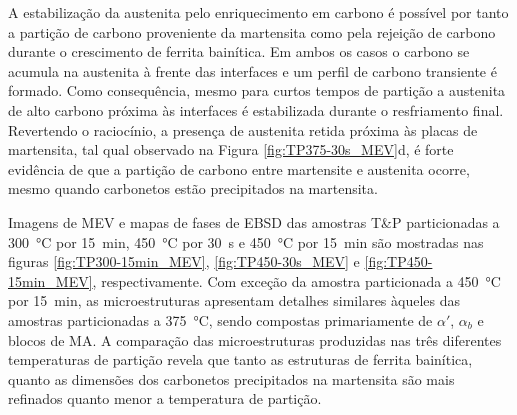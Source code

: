 A estabilização da austenita pelo enriquecimento em carbono é possível por tanto a partição de carbono proveniente da martensita como pela rejeição de carbono durante o crescimento de ferrita bainítica. Em ambos os casos o carbono se acumula na austenita à frente das interfaces e um perfil de carbono transiente é formado. Como consequência, mesmo para curtos tempos de partição a austenita de alto carbono próxima às interfaces é estabilizada durante o resfriamento final.
Revertendo o raciocínio, a presença de austenita retida próxima às placas de martensita, tal qual observado na Figura \ref{fig:TP375-30s_MEV}d, é forte evidência de que a partição de carbono entre martensite e austenita ocorre, mesmo quando carbonetos estão precipitados na martensita.

Imagens de MEV e mapas de fases de EBSD das amostras T\&P particionadas a \SI{300}{\degreeCelsius} por 15~min, \SI{450}{\degreeCelsius} por 30~s e \SI{450}{\degreeCelsius} por 15~min são mostradas nas figuras \ref{fig:TP300-15min_MEV}, \ref{fig:TP450-30s_MEV} e \ref{fig:TP450-15min_MEV}, respectivamente. Com exceção da amostra particionada a \SI{450}{\degreeCelsius} por 15~min, as microestruturas apresentam detalhes similares àqueles das amostras particionadas a \SI{375}{\degreeCelsius}, sendo compostas primariamente de $\alpha'$, $\alpha_b$ e blocos de MA. A comparação das microestruturas produzidas nas três diferentes temperaturas de partição revela que tanto as estruturas de ferrita bainítica, quanto as dimensões dos carbonetos precipitados na martensita são mais refinados quanto menor a temperatura de partição. 

